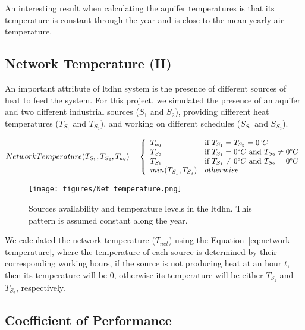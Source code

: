 \documentclass{article}
\begin{document}
An interesting result when calculating the aquifer temperatures is that its temperature is constant through the year and is close to the mean yearly air temperature.

\subsection{Network Temperature (H)}

An important attribute of \gls{ltdhn} system is the presence of different sources of heat to feed the system. For this project, we simulated the presence of an aquifer and two different industrial sources ($S_1$ and $S_2$), providing different heat temperatures ($T_{S_1}$ and $T_{S_2}$), and working on different schedules ($S_{S_1}$ and $S_{S_2}$).

\begin{equation}
\label{eq:network-temperature}
    NetworkTemperature(T_{S_1}, T_{S_2}, T_{aq}) = 
\left\{
	\begin{array}{lll}
		T_{aq}  
		    & \mbox{if } T_{S_1} = T_{S_2} = 0 \degree C \\
		T_{S_2} 
		    & \mbox{if }  T_{S_1} = 0 \degree C \mbox{ and } T_{S_2} \neq 0 \degree C \\
		T_{S_1} 
		    & \mbox{if }  T_{S_1} \neq 0 \degree C \mbox{ and } T_{S_2} = 0 \degree C \\
		min(T_{S_1}, T_{S_2})
		    & otherwise \\
	\end{array}
\right.
\end{equation}

\begin{figure}[H]
\centering
\texttt{[image: figures/Net\_temperature.png]}
\caption{Sources availability and temperature levels in the \gls{ltdhn}. This pattern is assumed constant along the year.}
\label{fig:Net_temp}
\end{figure}

We calculated the network temperature ($T_{net}$) using the Equation~\ref{eq:network-temperature}, where the temperature of each source is determined by their corresponding working hours, \idest if the source is not producing heat at an hour $t$, then its temperature will be $0$, otherwise its temperature will be either $T_{S_1}$ and $T_{S_2}$, respectively.


\subsection{Coefficient of Performance}
\end{document}
